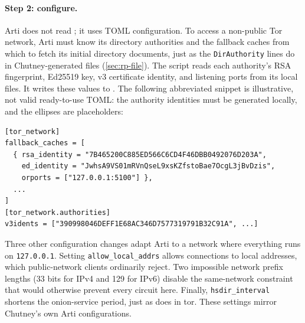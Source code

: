 \paragraph{Step 2: configure.} Arti does not read ; it uses TOML configuration. To access a non-public Tor network, Arti must know its directory authorities and the fallback caches from which to fetch its initial directory documents, just as the \texttt{DirAuthority} lines do in Chutney-generated  files (\cref{sec:rp-file}). The  script reads each authority's RSA fingerprint, Ed25519 key, v3 certificate identity, and listening ports from its local files. It writes these values to . The following abbreviated snippet is illustrative, not valid ready-to-use TOML: the authority identities must be generated locally, and the ellipses are placeholders:
\begin{lstlisting}[numbers=none]
[tor_network]
fallback_caches = [
  { rsa_identity = "7B465200C885ED566C6CD4F46DBB0492076D203A",
    ed_identity = "JwhsA9VS01mRVnQseL9xsKZfstoBae7OcgL3jBvDzis",
    orports = ["127.0.0.1:5100"] },
  ...
]
[tor_network.authorities]
v3idents = ["390998046DEFF1E68AC346D7577319791B32C91A", ...]
\end{lstlisting}
Three other configuration changes adapt Arti to a network where everything runs on \texttt{127.0.0.1}. Setting \texttt{allow\_local\_addrs} allows connections to local addresses, which public-network clients ordinarily reject. Two impossible network prefix lengths (33 bits for IPv4 and 129 for IPv6) disable the same-network constraint that would otherwise prevent every circuit here. Finally, \texttt{hsdir\_interval} shortens the onion-service period, just as  does in tor. These settings mirror Chutney's own Arti configurations.

